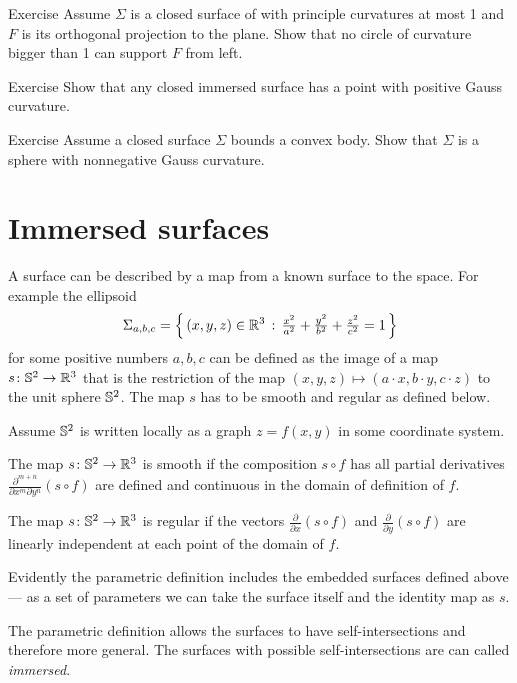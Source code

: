 \begin{thm}{Exercise}\label{ex:projection}
Assume $\Sigma$ is a closed surface of with principle curvatures at most 1
and $F$ is its orthogonal projection to the plane.
Show that no circle of curvature bigger than 1 can support $F$ from left. 
\end{thm}

\begin{thm}{Exercise}
Show that any closed immersed surface has a point with positive Gauss curvature.
\end{thm}

\begin{thm}{Exercise}
Assume a closed surface $\Sigma$ bounds a convex body.
Show that $\Sigma$ is a sphere with nonnegative Gauss curvature. 
\end{thm}

\section{Immersed surfaces}

A surface can be described by a map from a known surface to the space.
For example the ellipsoid
\[\Sigma_{a,b,c}=\left\{\,{(x,y,z)\in\mathbb{R}^3}\,:\,{\tfrac{x^2}{a^2}+\tfrac{y^2}{b^2}+\tfrac{z^2}{c^2}=1}\,\right\}\]
for some positive numbers $a,b,c$ can be defined as the image of a map $s\colon\mathbb{S}^2\to\mathbb{R}^3$ that is the restriction of the map $(x,y,z)\mapsto (a\cdot x, b\cdot y,c\cdot z)$ to the unit sphere $\mathbb{S}^2$.
The map $s$ has to be smooth and regular as defined below. 

Assume $\mathbb{S}^2$ is written locally as a graph $z=f(x,y)$ in some coordinate system.

The map $s\colon\mathbb{S}^2\to \mathbb{R}^3$ is  smooth if the composition $s\circ f$ has all partial derivatives $\frac{\partial^{m+n}}{\partial x^m\partial y^n}(s\circ f)$ are defined and continuous in the domain of definition of $f$.

The map $s\colon\mathbb{S}^2\to \mathbb{R}^3$ is regular
if the vectors $\frac{\partial}{\partial x}(s\circ f)$ and $\frac{\partial}{\partial y}(s\circ f)$ are linearly independent at each point of the domain of $f$.

Evidently the parametric definition includes the embedded surfaces defined above --- as a set of parameters we can take the surface itself and the identity map as $s$.

 The parametric definition allows the surfaces to have self-intersections and therefore more general.
The surfaces with possible self-intersections are  can called \emph{immersed}.

